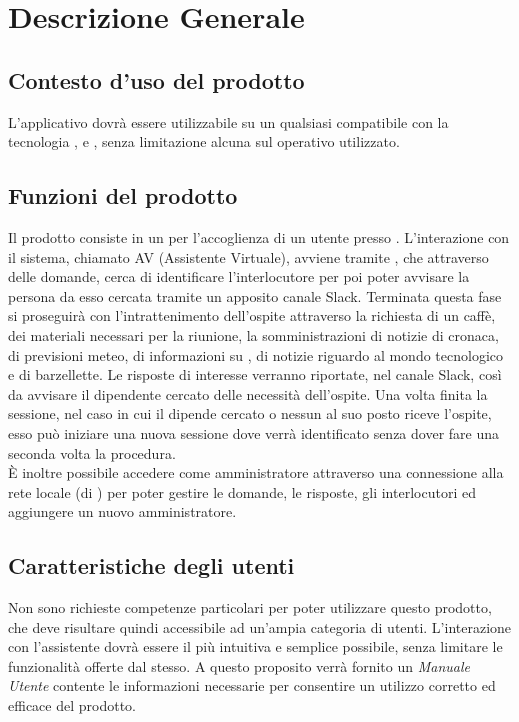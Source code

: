 \documentclass[../AnalisiDeiRequisiti.tex]{subfiles}
\begin{document}
\section{Descrizione Generale}
	\subsection{Contesto d'uso del prodotto}
	L'applicativo dovrà essere utilizzabile su un qualsiasi  compatibile con la tecnologia ,  e , senza limitazione alcuna sul  operativo utilizzato.
	\subsection{Funzioni del prodotto}
	Il prodotto consiste in un  per l'accoglienza di un utente presso \prop. L'interazione con il sistema, chiamato  AV (Assistente Virtuale), avviene tramite , che attraverso delle domande, cerca di identificare l'interlocutore per poi poter avvisare la persona da esso cercata tramite un apposito canale Slack. Terminata questa fase si proseguirà con l'intrattenimento dell'ospite attraverso la richiesta di un caffè, dei materiali necessari per la riunione, la somministrazioni di notizie di cronaca, di previsioni meteo, di informazioni su \prop, di notizie riguardo al mondo tecnologico e di barzellette. Le risposte di interesse verranno riportate, nel canale Slack, così da avvisare il dipendente cercato delle necessità dell'ospite. Una volta finita la sessione, nel caso in cui il dipende cercato o nessun al suo posto riceve l'ospite, esso può iniziare una nuova sessione dove verrà identificato senza dover fare una seconda volta la procedura.\\
	È inoltre possibile accedere come amministratore attraverso una connessione alla rete locale (di \prop) per poter gestire le domande, le risposte, gli interlocutori ed aggiungere un nuovo amministratore.
	\subsection{Caratteristiche degli utenti}
	Non sono richieste competenze particolari per poter utilizzare questo prodotto, che deve risultare quindi accessibile ad un'ampia categoria di utenti. L'interazione con l'assistente dovrà essere il più intuitiva e semplice possibile, senza limitare le funzionalità offerte dal  stesso. A questo proposito verrà fornito un \textit{Manuale Utente} contente le informazioni necessarie per consentire un utilizzo corretto ed efficace del prodotto.
\end{document}
